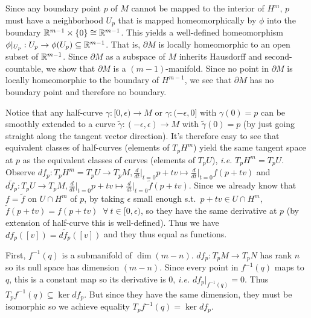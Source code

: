 \documentclass[12pt]{article}
\begin{document}
\begin{problem}[9.6]
Since any boundary point $ p$ of $ M$ cannot be mapped to the interior of  $ H^{m}$, $ p$ must have a neighborhood $ U_p$ that is mapped homeomorphically by $ \phi$ into the boundary $ \mathbb{R}^{m-1} \times \{0\} \cong \mathbb{R}^{m-1}$. This yields a well-defined homeomorphism $ \phi|_{ U_p}: U_p \to \phi(U_p) \subseteq \mathbb{R}^{m-1}$. That is, $ \partial M$ is locally homeomorphic to an open subset of $ \mathbb{R}^{m-1}$. Since $ \partial M$ as a subspace of $ M$ inherits Hausdorff and second-countable, we show that $ \partial M$ is a $ (m-1)$-manifold. Since no point in $ \partial M$ is locally homeomorphic to the boundary of $ H^{m-1}$, we see that $ \partial M$ has no boundary point and therefore no boundary.
\end{problem}

\begin{problem}[9.9]
	Notice that any half-curve $ \gamma: [0, \epsilon) \to M$ or $ \gamma:(- \epsilon,0]$ with $ \gamma(0) = p$ can be smoothly extended to a curve $ \widetilde{ \gamma}:(- \epsilon, \epsilon) \to M$ with $ \widetilde{ \gamma}(0) =p$ (by just going straight along the tangent vector direction). It's therefore easy to see that equivalent classes of half-curves (elements of $ T_p H^{m}$) yield the same tangent space at $ p$ as the equivalent classes of curves (elements of $ T_p U$), \emph{i.e.} $ T_p H^{m} = T_p U$. Observe $ df_p:T_p H^{m}= T_p U \to T_pM, \frac{d}{dt}\bigg|_{t=0} p+tv \mapsto \frac{d}{dt}\bigg|_{t=0} f(p+tv)$ and $ d \widetilde{ f}_p: T_pU \to T_pM, \frac{d}{dt}\bigg|_{t=0} p+tv \mapsto \frac{d}{dt}\bigg|_{t=0} \widetilde{ f}(p+tv)$. Since we already know that $ f = \widetilde{ f}$ on $ U \cap H^{m}$ of $ p$, by taking $ \epsilon$ small enough s.t.\ $ p+tv \in U \cap H^{m}$, $ \widetilde{ f}(p+tv) = f(p+tv)$ $ \ \forall \ t \in [0, \epsilon)$, so they have the same derivative at $ p$ (by extension of half-curve this is well-defined). Thus we have $ df_p([v]) = d \widetilde{ f}_p([v])$ and they thus equal as functions.
\end{problem}

\begin{problem}[9.13]
First, $ f^{-1}(q)$ is a submanifold of $ \dim (m-n)$. $ df_p: T_pM \to T_pN$ has rank $ n$ so its null space has dimension  $ (m-n)$.  Since every point in $ f^{-1}(q)$ maps to $ q$, this is a constant map so its derivative is 0,  \emph{i.e.} $ df_p|_{f^{-1}(q)} = 0$. Thus $ T_p f^{-1}(q) \subseteq \ker df_p$. But since they have the same dimension, they must be isomorphic so we achieve equality $ T_p f^{-1}(q) = \ker df_p$.
\end{problem}
\end{document}
